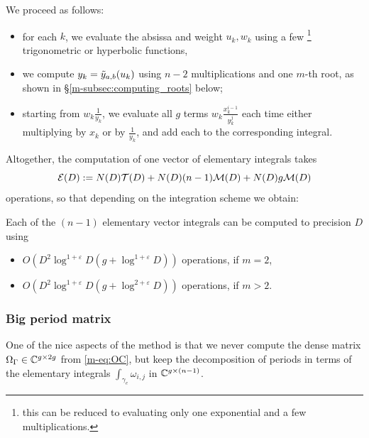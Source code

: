 \documentclass[main.tex]{subfiles}
\begin{document}
   We proceed as follows:
   \begin{itemize}
   \item for each $k$, we evaluate the absissa and weight $u_k,w_k$ using
       a few \footnote{this can be reduced to evaluating only one exponential
       and a few multiplications.} trigonometric or hyperbolic functions,
   \item we compute $y_k=\tilde{y}_{a,b}(u_k)$ using $n-2$ multiplications and one $m$-th root,
       as shown in \S \ref{m-subsec:computing_roots} below;
   \item starting from $w_k\frac{1}{y_k}$, we evaluate all $g$ terms $w_k\frac{x_k^{i-1}}{y_k^j}$
       each time either multiplying by $x_k$ or by $\frac{1}{y_k}$, and add each to the corresponding
       integral.
   \end{itemize}

   Altogether, the computation of one vector of elementary integrals takes
   \begin{equation}\label{eq:elem_int_complexity}
    \mathcal E(D) := N(D)\mathcal T(D)+N(D)(n-1)\mathcal M(D)+N(D)g\mathcal M(D)
   \end{equation}
    operations,
   so that depending on the integration scheme we obtain:
   \begin{thm}\label{thm:complexity_integrals}
       Each of the $(n-1)$ elementary vector integrals can be computed to precision $D$ using
       \begin{itemize}
           \item $O(D^2\log^{1+\varepsilon} D (g + \log^{1+\varepsilon} D))$ operations, if $m=2$,
           \item $O(D^2\log^{1+\varepsilon} D (g + \log^{2+\varepsilon} D))$ operations, if $m>2$.
       \end{itemize}
   \end{thm}


   \subsubsection{Big period matrix}

   One of the nice aspects of the method is that we never compute
   the dense matrix $\Omega_{\Gamma}\in\mathbb{C}^{g\times 2g}$ from \eqref{m-eq:OC}, but
   keep the decomposition of periods in terms of the elementary integrals
   $\int_{\gamma_e}\omega_{i,j}$ in $\mathbb{C}^{g\times (n-1)}$.
\end{document}
